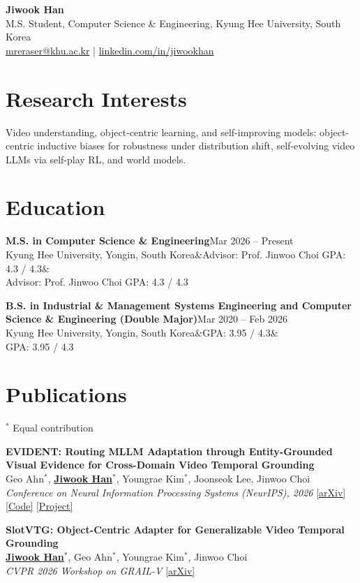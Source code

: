 \documentclass[11pt]{article}
\newcommand{\entry}[4]{%
  \textbf{#1}\hfill{\color{muted}#2}\\
  #3\ifx&#4&\else\\{\small\color{muted}#4}\fi\par\vspace{6pt}}
\newcommand{\pub}[4]{%
  \item \textbf{#1}\\ #2\\ \textit{#3} \hfill {\small #4}}
\begin{document}
{\LARGE\bfseries Jiwook Han}\\[4pt]
M.S. Student, Computer Science \& Engineering, Kyung Hee University, South Korea\\[2pt]
{\small
\href{mailto:mreraser@khu.ac.kr}{mreraser@khu.ac.kr} \;|\;
\href{https://www.linkedin.com/in/jiwookhan/}{linkedin.com/in/jiwookhan}
}

\section*{Research Interests}
Video understanding, object-centric learning, and self-improving models: object-centric inductive biases for robustness under distribution shift, self-evolving video LLMs via self-play RL, and world models.

\section*{Education}
\entry{M.S. in Computer Science \& Engineering}{Mar 2026 -- Present}
  {Kyung Hee University, Yongin, South Korea}
  {Advisor: Prof. Jinwoo Choi \quad GPA: 4.3 / 4.3}
\entry{B.S. in Industrial \& Management Systems Engineering and Computer Science \& Engineering (Double Major)}{Mar 2020 -- Feb 2026}
  {Kyung Hee University, Yongin, South Korea}
  {GPA: 3.95 / 4.3}

\section*{Publications}
{\small $^*$ Equal contribution}
\begin{enumerate}[leftmargin=*,label={[\arabic*]},itemsep=6pt]
  \pub{EVIDENT: Routing MLLM Adaptation through Entity-Grounded Visual Evidence for Cross-Domain Video Temporal Grounding}
      {Geo Ahn$^*$, \underline{\textbf{Jiwook Han}}$^*$, Youngrae Kim$^*$, Joonseok Lee, Jinwoo Choi}
      {Conference on Neural Information Processing Systems (NeurIPS), 2026}
      {\href{https://arxiv.org/abs/2605.26104}{[arXiv]} \href{https://github.com/KHU-VLL/EVIDENT}{[Code]} \href{https://mreraser.github.io/EVIDENT_project_page/}{[Project]}}
  \pub{SlotVTG: Object-Centric Adapter for Generalizable Video Temporal Grounding}
      {\underline{\textbf{Jiwook Han}}$^*$, Geo Ahn$^*$, Youngrae Kim$^*$, Jinwoo Choi}
      {CVPR 2026 Workshop on GRAIL-V}
      {\href{https://arxiv.org/abs/2603.25733}{[arXiv]}} %
\end{enumerate}
\end{document}
